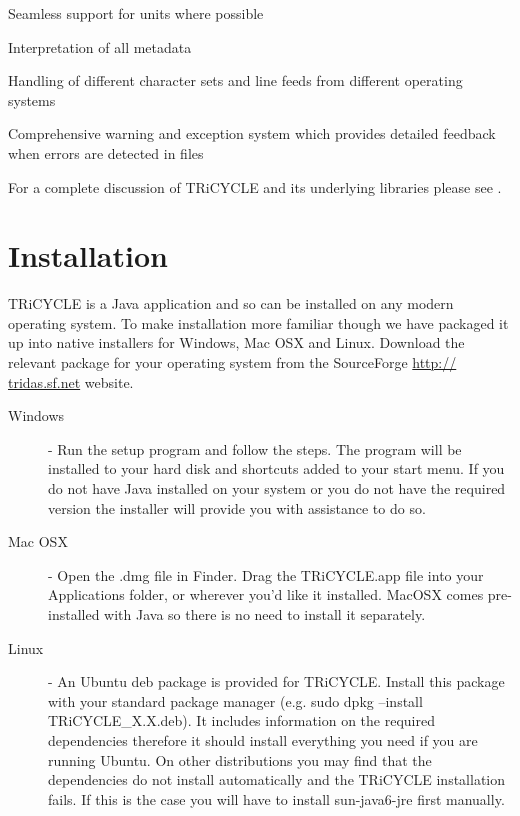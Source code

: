 \documentclass[10pt, headsepline,DIV14,BCOR0.5cm]{scrreprt}
\begin{document}
\begin{itemize*}
 \item Seamless support for units where possible
 \item Interpretation of all metadata
 \item Handling of different character sets and line feeds from different operating systems
 \item Comprehensive warning and exception system which provides detailed feedback when errors are
detected in files
\end{itemize*}


For a complete discussion of TRiCYCLE and its underlying libraries please see \citep{tricycle}.


\chapter{Installation}

TRiCYCLE is a Java application and so can be installed on any modern operating system. To make
installation more familiar though we have packaged it up into native installers for Windows, Mac OSX
and Linux. Download the relevant package for your operating system from the SourceForge \url{http://
tridas.sf.net} website.

\begin{description}
 \item[Windows] - Run the setup program and follow the steps. The program will be installed to your hard disk
and shortcuts added to your start menu. If you do not have Java installed on your system or
you do not have the required version the installer will provide you with assistance to do so.
 \item[Mac OSX] - Open the .dmg file in Finder. Drag the TRiCYCLE.app file into your Applications folder, or
wherever you'd like it installed. MacOSX comes pre-installed with Java so there is no need
to install it separately.
 \item[Linux] - An Ubuntu deb package is provided for TRiCYCLE. Install this package with your standard
package manager (e.g. sudo dpkg --install TRiCYCLE\_X.X.deb). It includes information
on the required dependencies therefore it should install everything you need if you are
running Ubuntu. On other distributions you may find that the dependencies do not install
automatically and the TRiCYCLE installation fails. If this is the case you will have to install
sun-java6-jre first manually.
\end{description}
\end{document}
